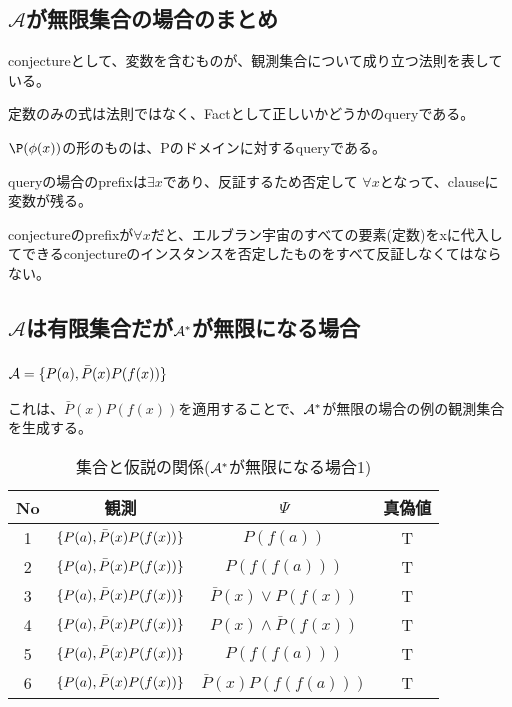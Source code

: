 \documentclass[10pt, oneside]{jarticle}   	%
\begin{document}
\subsection{$\mathcal{A}$が無限集合の場合のまとめ}
conjectureとして、変数を含むものが、観測集合について成り立つ法則を表している。

定数のみの式は法則ではなく、Factとして正しいかどうかのqueryである。

$\P(\phi(x))$の形のものは、Pのドメインに対するqueryである。

queryの場合のprefixは$\exists x$であり、反証するため否定して $\forall x$となって、clauseに変数が残る。

conjectureのprefixが$\forall x$だと、エルブラン宇宙のすべての要素(定数)をxに代入してできるconjectureのインスタンスを否定したものをすべて反証しなくてはならない。


\newpage
\subsection{ $\mathcal{A}$は有限集合だが$\mathcal{A}^{*}$が無限になる場合}
\subsubsection{$\mathcal{A}=\{{P(a),  \bar{P}(x)P(f(x))}\}$}
これは、$\bar{P}(x)P(f(x))$を適用することで、$\mathcal{A}^{*}$が無限の場合の例の観測集合を生成する。

\begin{table}[htbp]
 \centering
 \begin{tabular}{|c|c|c|c|}\hline
   No & 観測 & $\Psi$ & 真偽値 \\ \hline
   1 & $\{{P(a), \bar{P}(x)P(f(x))}\}$ & $P(f(a))$ & T \\ \hline
   2 & $\{{P(a), \bar{P}(x)P(f(x))}\}$ & $P(f(f(a)))$ & T \\ \hline
   3 & $\{{P(a), \bar{P}(x)P(f(x))}\}$ & $\bar{P}(x) \lor P(f(x))$ & T \\ \hline
   4 & $\{{P(a), \bar{P}(x)P(f(x))}\}$ & $P(x) \land \bar{P}(f(x))$ & T \\ \hline
   5 & $\{{P(a), \bar{P}(x)P(f(x))}\}$ & $P(f(f(a)))$ & T \\ \hline
   6 & $\{{P(a), \bar{P}(x)P(f(x))}\}$ & $\bar{P}(x)P(f(f(a)))$ & T \\ \hline
 \end{tabular}
 \caption{集合と仮説の関係($\mathcal{A}^{*}$が無限になる場合1)}
 \label{tab:ex0401}
\end{table}
\end{document}
